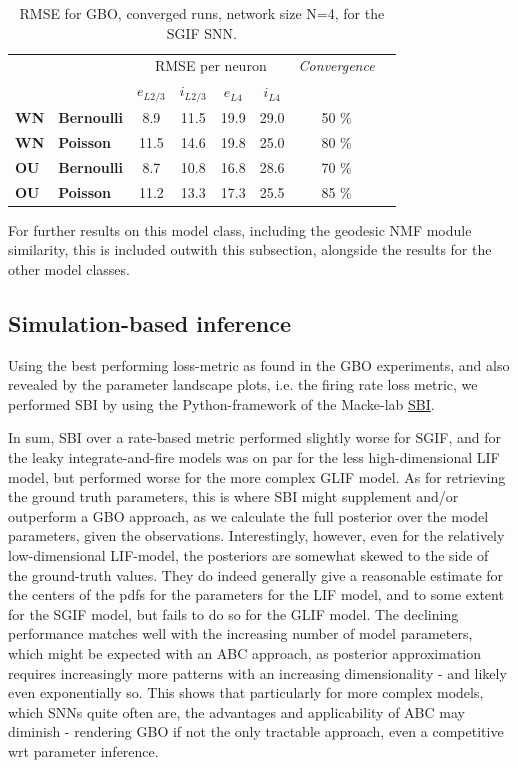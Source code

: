 \documentclass[mphil,deptreport,ianc]{infthesis} %
\begin{document}
\begin{table}
\caption{RMSE for GBO, converged runs, network size N=4, for the SGIF SNN.}
\label{tab:rmse_converged_GBO_pop}
\begin{center}
\begin{tabular}{ l l c c c c c c }
& & \multicolumn{4}{c}{RMSE per neuron} & \textit{Convergence} \\
& & $e_{L2/3}$ & $i_{L2/3}$ & $e_{L4}$ & $i_{L4}$ \\
 \textbf{WN} & \textbf{Bernoulli} & 8.9 & 11.5 & 19.9 & 29.0 & 50 \% \\ 
 \textbf{WN} & \textbf{Poisson} & 11.5 & 14.6 & 19.8 & 25.0 & 80 \% \\  
 \textbf{OU} & \textbf{Bernoulli} & 8.7 & 10.8 & 16.8 & 28.6 & 70 \% \\ 
 \textbf{OU} & \textbf{Poisson} & 11.2 & 13.3 & 17.3 & 25.5 & 85 \% \\  
\end{tabular}
\end{center}
\end{table}

For further results on this model class, including the geodesic NMF module similarity, this is included outwith this subsection, alongside the results for the other model classes.



\subsection{Simulation-based inference}

Using the best performing loss-metric as found in the GBO experiments, and also revealed by the parameter landscape plots, i.e. the firing rate loss metric, we performed SBI by using the Python-framework of the Macke-lab \href{https://github.com/mackelab/sbi}{SBI}.

In sum, SBI over a rate-based metric performed slightly worse for SGIF, and for the leaky integrate-and-fire models was on par for the less high-dimensional LIF model, but performed worse for the more complex GLIF model.
As for retrieving the ground truth parameters, this is where SBI might supplement and/or outperform a GBO approach, as we calculate the full posterior over the model parameters, given the observations.
Interestingly, however, even for the relatively low-dimensional LIF-model, the posteriors are somewhat skewed to the side of the ground-truth values. They do indeed generally give a reasonable estimate for the centers of the pdfs for the parameters for the LIF model, and to some extent for the SGIF model, but fails to do so for the GLIF model.
The declining performance matches well with the increasing number of model parameters, which might be expected with an ABC approach, as posterior approximation requires increasingly more patterns with an increasing dimensionality - and likely even exponentially so.
This shows that particularly for more complex models, which SNNs quite often are, the advantages and applicability of ABC may diminish - rendering GBO if not the only tractable approach, even a competitive wrt parameter inference.
\end{document}
